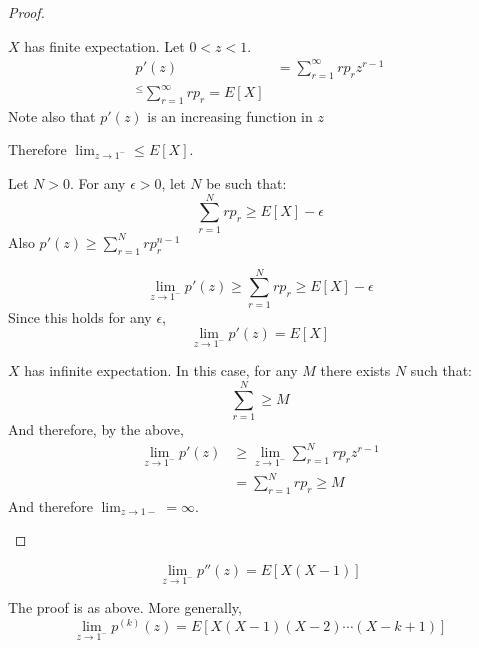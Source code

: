 \documentclass[../Main.tex]{subfiles}
\begin{document}
\begin{proof}
    \begin{case}{$X$ has finite expectation.}
        Let $0 < z < 1$.
        \begin{align*}
            p'(z) &= \sum_{r=1}^\infty r p_r z^{r-1} \\
            ^\leq \sum_{r=1}^\infty rp_r = E[X]
        \end{align*}
        Note also that $p'(z)$ is an increasing function in $z$\par
        Therefore $\lim_{z \to 1^-} \leq E[X]$.\par
        Let $N > 0$. For any $\epsilon > 0$, let $N$ be such that:
        \begin{equation*}
            \sum_{r=1}^N rp_r \geq E[X] - \epsilon
        \end{equation*}
        Also $p'(z) \geq \sum_{r=1}^N rp_r ^{n-1}$\par
        \begin{equation*}
            \lim_{z \to 1^-} p'(z) \geq \sum_{r=1}^N rp_r \geq E[X] - \epsilon
        \end{equation*}
        Since this holds for any $\epsilon$,
        \begin{equation*}
            \lim_{z \to 1^-} p'(z) = E[X]
        \end{equation*}
    \end{case}
    \begin{case}{$X$ has infinite expectation.}
        In this case, for any $M$ there exists $N$ such that:
        \begin{equation*}
            \sum_{r=1}^N \geq M
        \end{equation*}
        And therefore, by the above,
        \begin{align*}
            \lim_{z \to 1^-} p'(z) &\geq \lim_{z \to 1^-} \sum_{r=1}^N rp_r z^{r-1} \\
            &=\sum_{r=1}^N rp_r \geq M 
        \end{align*}
        And therefore $\lim_{z \to 1-} = \infty$.
    \end{case}
\end{proof}
\begin{theorem}
    \begin{equation*}
        \lim_{z \to 1^-} p''(z) = E[X(X-1)]
    \end{equation*}
\end{theorem}
The proof is as above. More generally,
\begin{equation}
    \lim_{z \to 1^-} p^{(k)}(z) = E[X(X-1)(X-2) \cdots(X-k+1)]
    \label{eqnPGFDerivative}
\end{equation}
\end{document}
